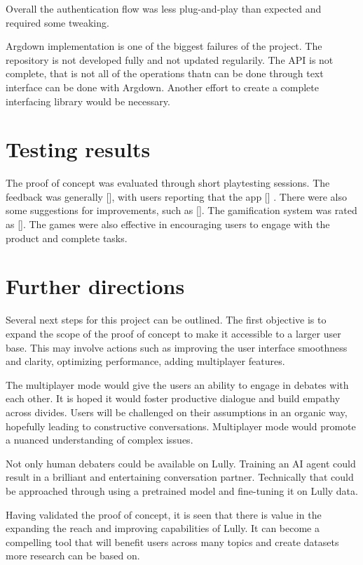 \documentclass{article}
\begin{document}
Overall the authentication flow was less plug-and-play than expected and required some tweaking. 

Argdown implementation is one of the biggest failures of the project. The repository is not developed fully and not updated regularily. The API is not complete, that is not all of the operations thatn can be done through text interface can be done with Argdown. Another effort to create a complete interfacing library would be necessary.

\section{Testing results}
The proof of concept was evaluated through short playtesting sessions. The feedback was generally [], with users reporting that the app [] . There were also some suggestions for improvements, such as [].
The gamification system was rated as [].
The games were also effective in encouraging users to engage with the product and complete tasks.


\section{Further directions}
Several next steps for this project can be outlined. The first objective is to expand the scope of the proof of concept to make it accessible to a larger user base. This may involve actions such as improving the user interface smoothness and clarity, optimizing performance, adding multiplayer features.

The multiplayer mode would give the users an ability to engage in debates with each other. It is hoped it would foster productive dialogue and build empathy across divides.
Users will be challenged on their assumptions in an organic way, hopefully leading to constructive conversations. Multiplayer mode would promote a nuanced understanding of complex issues.

Not only human debaters could be available on Lully. Training an AI agent could result in a brilliant and entertaining conversation partner. Technically that could be approached through using a pretrained model and fine-tuning it on Lully data.

Having validated the proof of concept, it is seen that there is value in the expanding the reach and improving capabilities of Lully. It can become a compelling tool that will benefit users across many topics and create datasets more research can be based on.
\end{document}
